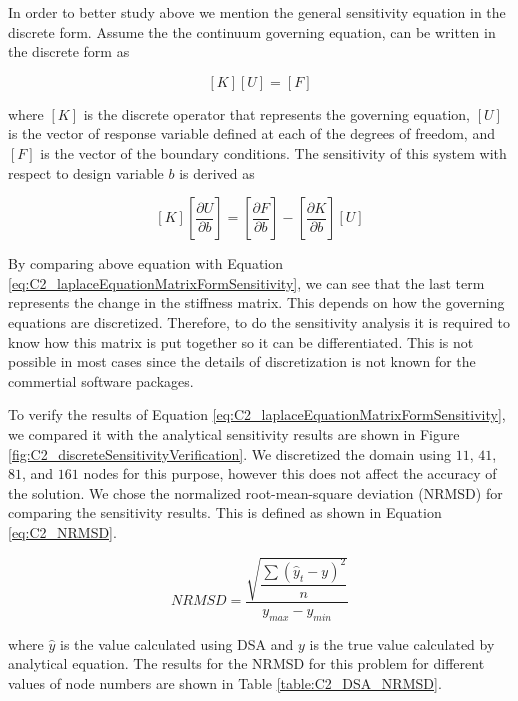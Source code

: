 In order to better study above we mention the general sensitivity equation in the discrete form. Assume the the continuum governing equation, can be written in the discrete form as

\begin{equation*}
	\left[ K \right] \left[ U \right] = \left[ F \right]
\end{equation*}

where $[K]$ is the discrete operator that represents the governing equation, $[U]$ is the vector of response variable defined at each of the degrees of freedom, and $[F]$ is the vector of the boundary conditions. The sensitivity of this system with respect to design variable $b$ is derived as

\begin{equation*}
	\left[ K \right] \left[ \frac{\partial U}{\partial b} \right] = 
	\left[ \frac{\partial F}{\partial b} \right] - 
		\left[ \frac{\partial K}{\partial b} \right] \left[ U \right]
\end{equation*}

By comparing above equation with Equation \eqref{eq:C2_laplaceEquationMatrixFormSensitivity}, we can see that the last term represents the change in the stiffness matrix. This depends on how the governing equations are discretized. Therefore, to do the sensitivity analysis it is required to know how this matrix is put together so it can be differentiated. This is not possible in most cases since the details of discretization is not known for the commertial software packages.

To verify the results of Equation \eqref{eq:C2_laplaceEquationMatrixFormSensitivity}, we compared it with the analytical sensitivity results are shown in Figure \ref{fig:C2_discreteSensitivityVerification}. We discretized the domain using $11$, $41$, $81$, and $161$ nodes for this purpose, however this does not affect the accuracy of the solution. We chose the normalized root-mean-square deviation (NRMSD) for comparing the sensitivity results. This is defined as shown in Equation \eqref{eq:C2_NRMSD}.

\begin{equation}\label{eq:C2_NRMSD}
	NRMSD = \dfrac{\sqrt{\dfrac{\sum (\hat{y}_t - y)^2}{n}}}{y_{max} - y_{min}}
\end{equation}

where $\hat{y}$ is the value calculated using DSA and $y$ is the true value calculated by analytical equation. The results for the NRMSD for this problem for different values of node numbers are shown in Table \ref{table:C2_DSA_NRMSD}.

